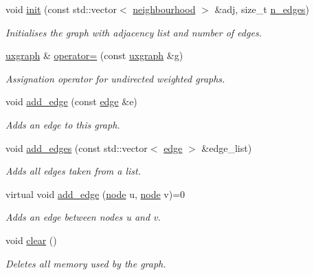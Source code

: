 \begin{DoxyCompactItemize}
void \hyperlink{classlgraph_1_1uxgraph_ab0e84975aa8048e6d93622d1b4e0c567}{init} (const std\+::vector$<$ \hyperlink{namespacelgraph_a052e7766c13f3a43cec0aec8173fdede}{neighbourhood} $>$ \&adj, size\+\_\+t \hyperlink{classlgraph_1_1xxgraph_af00bce8b07a42754601d1e3bebe2c1fa}{n\+\_\+edges})
\begin{DoxyCompactList}\small\item\em Initialises the graph with adjacency list and number of edges. \end{DoxyCompactList}\item 
\hyperlink{classlgraph_1_1uxgraph}{uxgraph} \& \hyperlink{classlgraph_1_1uxgraph_ac46d439a1620885943a55a3338f9474f}{operator=} (const \hyperlink{classlgraph_1_1uxgraph}{uxgraph} \&g)
\begin{DoxyCompactList}\small\item\em Assignation operator for undirected weighted graphs. \end{DoxyCompactList}\item 
void \hyperlink{classlgraph_1_1uxgraph_a1a826ff50563bc4021e16d712f309232}{add\+\_\+edge} (const \hyperlink{namespacelgraph_a76bd7d50719f03de7a85db259d80d572}{edge} \&e)
\begin{DoxyCompactList}\small\item\em Adds an edge to this graph. \end{DoxyCompactList}\item 
void \hyperlink{classlgraph_1_1uxgraph_ad20f841d6bb1147d087546c6054c55f3}{add\+\_\+edges} (const std\+::vector$<$ \hyperlink{namespacelgraph_a76bd7d50719f03de7a85db259d80d572}{edge} $>$ \&edge\+\_\+list)
\begin{DoxyCompactList}\small\item\em Adds all edges taken from a list. \end{DoxyCompactList}\item 
virtual void \hyperlink{classlgraph_1_1uxgraph_a5cf2ae9cf398b712fb9fe080b6976587}{add\+\_\+edge} (\hyperlink{namespacelgraph_a397169dd66adf725210a30fb7251773e}{node} u, \hyperlink{namespacelgraph_a397169dd66adf725210a30fb7251773e}{node} v)=0
\begin{DoxyCompactList}\small\item\em Adds an edge between nodes {\itshape u} and {\itshape v}. \end{DoxyCompactList}\item 
void \hyperlink{classlgraph_1_1uxgraph_aad397c98fd1f144350e4418971319a97}{clear} ()
\begin{DoxyCompactList}\small\item\em Deletes all memory used by the graph. \end{DoxyCompactList}\item 

\end{DoxyCompactItemize}
